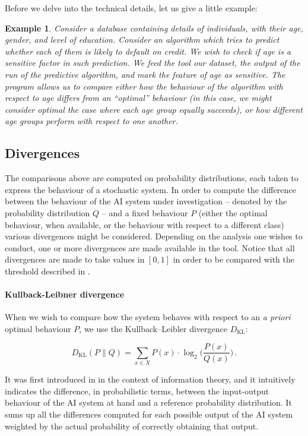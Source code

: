 \documentclass[
]{ceurart}
\newtheorem{example}{Example}
\begin{document}
Before we delve into the technical details, let us give a little example: 

\begin{example}
Consider a database containing details of individuals, with their age, gender, and level of education. Consider an algorithm which tries to predict whether each of them is likely to default on credit. We wish to check if age is a sensitive factor in such prediction. We feed the tool our dataset, the output of the run of the predictive algorithm, and mark the feature of age as sensitive. The program allows us to compare either how the behaviour of the algorithm with respect to age differs from an ``optimal'' behaviour (in this case, we might consider optimal the case where each age group equally succeeds), or how different age groups perform with respect to one another.
\end{example}
 
\subsection{Divergences}
The comparisons above are computed on probability distributions, each taken to express the behaviour of a stochastic system. In order to compute the difference between the behaviour of the AI system under investigation -- denoted by the probability distribution $Q$ -- and a fixed behaviour $P$ (either the optimal behaviour, when available, or the behaviour with respect to a different class) various divergences might be considered. Depending on the analysis one wishes to conduct, one or more divergences are made available in the tool. Notice that all divergences are made to take values in $[0,1]$ in order to be compared with the threshold described in .


\paragraph{Kullback-Leibner divergence}
When we wish to compare how the system behaves with respect to an \textit{a priori} optimal behaviour $P$, we use the Kullback–Leibler divergence $D_{\mathrm{KL}}$:

\[D_{\mathrm{KL}}(P\parallel Q)= \sum _{x\in X} P(x)\cdot \log_2 \Big( \frac{P(x)}{Q(x)}\Big)\,.\]

It was first introduced in \cite{dkl} in the context of information theory, and it intuitively indicates the difference, in probabilistic terms, between the input-output behaviour of the AI system at hand and a reference probability distribution. It sums up all the differences computed for each possible output of the AI system weighted by the actual probability of correctly obtaining that output.
\end{document}
